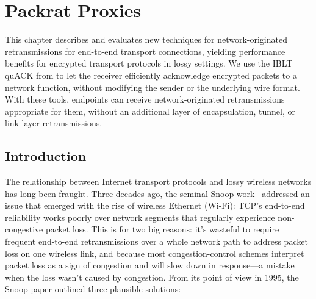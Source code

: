 \chapter{Packrat Proxies}
\label{sec:packrat}

This chapter describes and evaluates new techniques for
network-originated retransmissions for end-to-end transport
connections, yielding performance benefits for encrypted transport
protocols in lossy settings.  We use the IBLT quACK from 
to let the receiver efficiently acknowledge
encrypted packets to a network function, without modifying the sender
or the underlying wire format. With these tools, endpoints can receive
network-originated retransmissions appropriate for them, without an
additional layer of encapsulation, tunnel, or link-layer
retransmissions.

\section{Introduction}
\label{sec:packrat:intro}

The relationship between Internet transport protocols and lossy
wireless networks has long been fraught. Three decades ago, the
seminal Snoop work~\cite{balakrishnan1995snoop} addressed an issue
that emerged with the rise of wireless Ethernet (Wi-Fi): TCP's
end-to-end reliability works poorly over network segments that
regularly experience non-congestive packet loss. This is for two big
reasons: it's wasteful to require frequent end-to-end retransmissions
over a whole network path to address packet loss on one wireless link,
and because most congestion-control schemes interpret packet loss as a
sign of congestion and will slow down in response---a mistake when the
loss wasn't caused by congestion. From its point of view in 1995, the
Snoop paper outlined three plausible solutions:

